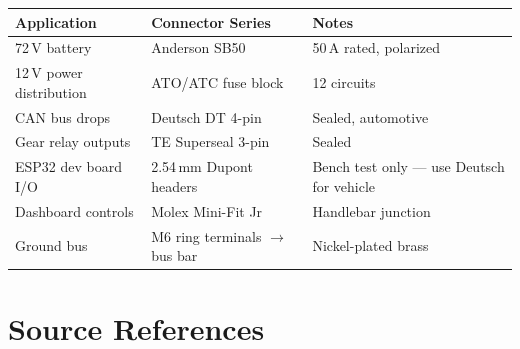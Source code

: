\documentclass[12pt,a4paper,oneside]{report}
\begin{document}
\begin{center}
\begin{tabular}{lll}
\toprule
\textbf{Application} & \textbf{Connector Series} & \textbf{Notes} \\
\midrule
72\,V battery            & Anderson SB50              & 50\,A rated, polarized \\
12\,V power distribution & ATO/ATC fuse block         & 12 circuits \\
CAN bus drops            & Deutsch DT 4-pin           & Sealed, automotive \\
Gear relay outputs       & TE Superseal 3-pin         & Sealed \\
ESP32 dev board I/O      & 2.54\,mm Dupont headers    & Bench test only --- use Deutsch for vehicle \\
Dashboard controls       & Molex Mini-Fit Jr          & Handlebar junction \\
Ground bus               & M6 ring terminals $\rightarrow$ bus bar & Nickel-plated brass \\
\bottomrule
\end{tabular}
\end{center}

\chapter{Source References}
\end{document}
